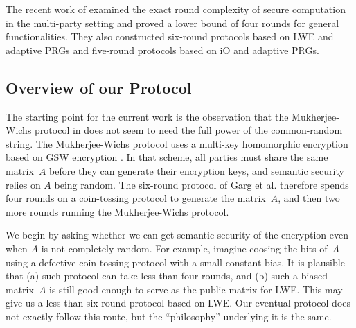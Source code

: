 The recent work of \cite{EC:GMPP16} examined the exact round complexity of secure computation in the multi-party setting and proved a lower bound of four rounds for general functionalities. They also constructed six-round protocols based on LWE and adaptive PRGs and five-round protocols based on iO and adaptive PRGs.



\subsection{Overview of our Protocol}
The starting point for the current work is the observation that the Mukherjee-Wichs protocol in \cite{MW16} does not seem to need the full power of the common-random string. The Mukherjee-Wichs protocol uses a multi-key homomorphic encryption based on GSW encryption \cite{C:GenSahWat13}. In that scheme, all parties must share the same matrix~$A$ before they can generate their encryption keys, and semantic security relies on $A$ being random.
The six-round protocol of Garg et al. \cite{EC:GMPP16} therefore spends four rounds on a coin-tossing protocol to generate the matrix~$A$, and then two more rounds running the Mukherjee-Wichs protocol.

We begin by asking whether we can get semantic security of the encryption even when $A$ is not completely random.
For example, imagine coosing the bits of~$A$ using a defective coin-tossing protocol with a small constant bias. It is plausible that (a) such protocol can take less than four rounds, and (b) such a biased matrix~$A$ is still good enough to serve as the public matrix for LWE. This may give us a less-than-six-round protocol based on LWE.
Our eventual protocol does not exactly follow this route, but the ``philosophy'' underlying it is the same.

